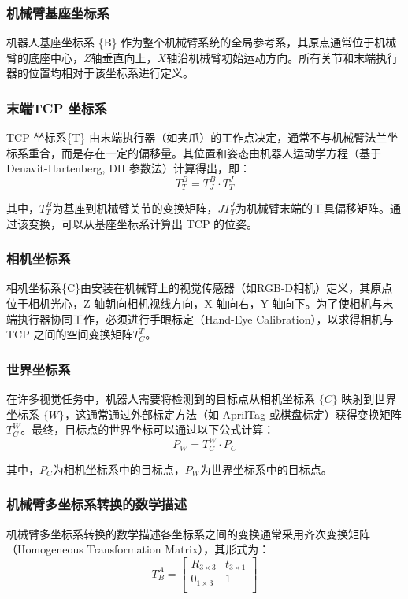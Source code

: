 \subsubsection{机械臂基座坐标系 }
机器人基座坐标系 \{B\} 作为整个机械臂系统的全局参考系，其原点通常位于机械臂的底座中心，$Z$轴垂直向上，$X$轴沿机械臂初始运动方向。所有关节和末端执行器的位置均相对于该坐标系进行定义。
\subsubsection{末端TCP 坐标系  }
TCP 坐标系\{T\} 由末端执行器（如夹爪）的工作点决定，通常不与机械臂法兰坐标系重合，而是存在一定的偏移量。其位置和姿态由机器人运动学方程（基于 Denavit-Hartenberg, DH 参数法）计算得出，即：
\begin{equation}
	\label{equ:coordinate_b_t}
	T^{B}_{T}=T^{B}_{J} \cdot T^{J}_{T} 
\end{equation}

其中，$T^{B}_{T} $为基座到机械臂关节的变换矩阵，$JT^{J}_{T}$为机械臂末端的工具偏移矩阵。通过该变换，可以从基座坐标系计算出 TCP 的位姿。
\subsubsection{相机坐标系 }
相机坐标系\{C\}由安装在机械臂上的视觉传感器（如RGB-D相机）定义，其原点位于相机光心，Z 轴朝向相机视线方向，X 轴向右，Y 轴向下。为了使相机与末端执行器协同工作，必须进行手眼标定（Hand-Eye Calibration），以求得相机与 TCP 之间的空间变换矩阵$T^{T}_{C}$。

\subsubsection{世界坐标系 }
在许多视觉任务中，机器人需要将检测到的目标点从相机坐标系 $\{C\}$ 映射到世界坐标系 $\{W\}$，这通常通过外部标定方法（如 AprilTag 或棋盘标定）获得变换矩阵 $T^{W}_{C}$。最终，目标点的世界坐标可以通过以下公式计算：
\begin{equation}
	\label{equ:coordinate_w_c}
	P_{W}=T^{W}_{C} \cdot P_{C} 
\end{equation}

其中，$P_{C} $为相机坐标系中的目标点，$P_{W}$为世界坐标系中的目标点。

\subsubsection{机械臂多坐标系转换的数学描述 }
机械臂多坐标系转换的数学描述各坐标系之间的变换通常采用齐次变换矩阵（Homogeneous Transformation Matrix），其形式为：
\begin{equation}
	\label{equ:coordinate_base}
	T^{A}_{B} =
	\begin{bmatrix}
		R_{3 \times 3} & t_{3\times 1}  \\
		0_{1 \times 3} & 1\\
	\end{bmatrix}
\end{equation}


